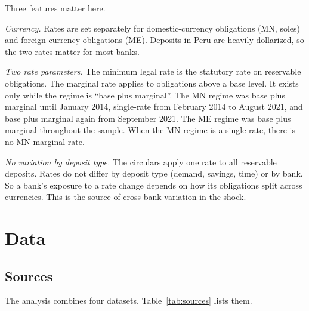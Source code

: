 \documentclass[11pt]{article}
\renewcommand{\_}{\origunderscore\hspace{0pt}}  %
\begin{document}
Three features matter here.

\textit{Currency.}
Rates are set separately for domestic-currency obligations (MN, soles) and foreign-currency obligations (ME).
Deposits in Peru are heavily dollarized, so the two rates matter for most banks.

\textit{Two rate parameters.}
The minimum legal rate is the statutory rate on reservable obligations.
The marginal rate applies to obligations above a base level.
It exists only while the regime is ``base plus marginal''.
The MN regime was base plus marginal until January 2014, single-rate from February 2014 to August 2021, and base plus marginal again from September 2021.
The ME regime was base plus marginal throughout the sample.
When the MN regime is a single rate, there is no MN marginal rate.

\textit{No variation by deposit type.}
The circulars apply one rate to all reservable deposits.
Rates do not differ by deposit type (demand, savings, time) or by bank.
So a bank's exposure to a rate change depends on how its obligations split across currencies.
This is the source of cross-bank variation in the shock.

\section{Data}
\label{sec:data}

\subsection{Sources}

The analysis combines four datasets.
Table~\ref{tab:sources} lists them.
\end{document}
